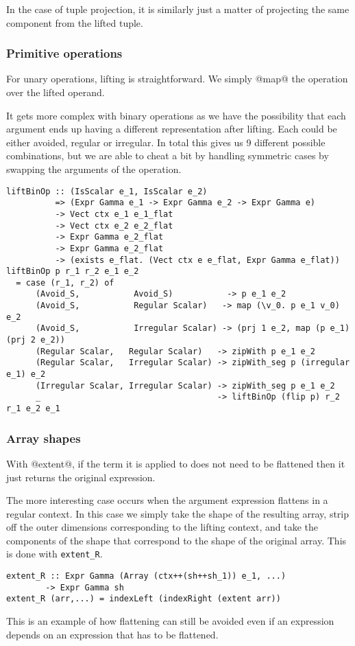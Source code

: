 In the case of tuple projection, it is similarly just a matter of projecting the same component from the lifted tuple.

\subsubsection{Primitive operations}
For unary operations, lifting is straightforward. We simply @map@ the operation over the lifted operand.

It gets more complex with binary operations as we have the possibility that each argument ends up having a different representation after lifting. Each could be either avoided, regular or irregular. In total this gives us 9 different possible combinations, but we are able to cheat a bit by handling symmetric cases by swapping the arguments of the operation.
%
\begin{lstlisting}[style=ndp]
liftBinOp :: (IsScalar e_1, IsScalar e_2)
          => (Expr Gamma e_1 -> Expr Gamma e_2 -> Expr Gamma e)
          -> Vect ctx e_1 e_1_flat
          -> Vect ctx e_2 e_2_flat
          -> Expr Gamma e_2_flat
          -> Expr Gamma e_2_flat
          -> (exists e_flat. (Vect ctx e e_flat, Expr Gamma e_flat))
liftBinOp p r_1 r_2 e_1 e_2
  = case (r_1, r_2) of
      (Avoid_S,           Avoid_S)           -> p e_1 e_2
      (Avoid_S,           Regular Scalar)   -> map (\v_0. p e_1 v_0) e_2
      (Avoid_S,           Irregular Scalar) -> (prj 1 e_2, map (p e_1) (prj 2 e_2))
      (Regular Scalar,   Regular Scalar)   -> zipWith p e_1 e_2
      (Regular Scalar,   Irregular Scalar) -> zipWith_seg p (irregular e_1) e_2
      (Irregular Scalar, Irregular Scalar) -> zipWith_seg p e_1 e_2
      _                                    -> liftBinOp (flip p) r_2 r_1 e_2 e_1
\end{lstlisting}
%

\subsubsection{Array shapes}
With @extent@, if the term it is applied to does not need to be flattened then it just returns the original expression.

The more interesting case occurs when the argument expression flattens in a regular context. In this case we simply take the shape of the resulting array, strip off the outer dimensions corresponding to the lifting context, and take the components of the shape that correspond to the shape of the original array. This is done with \lstinline[style=ndp]{extent_R}.
%
\begin{lstlisting}[style=ndp]
extent_R :: Expr Gamma (Array (ctx++(sh++sh_1)) e_1, ...)
        -> Expr Gamma sh
extent_R (arr,...) = indexLeft (indexRight (extent arr))
\end{lstlisting}
%
This is an example of how flattening can still be avoided even if an expression depends on an expression that has to be flattened.

